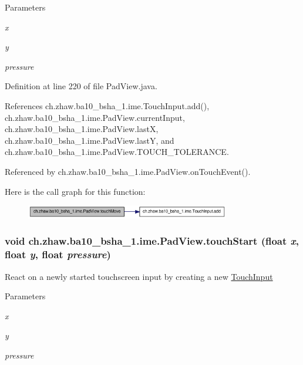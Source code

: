 \begin{DoxyParams}{Parameters}
\item[{\em x}]\item[{\em y}]\item[{\em pressure}]\end{DoxyParams}


Definition at line 220 of file PadView.java.

References ch.zhaw.ba10\_\-bsha\_\-1.ime.TouchInput.add(), ch.zhaw.ba10\_\-bsha\_\-1.ime.PadView.currentInput, ch.zhaw.ba10\_\-bsha\_\-1.ime.PadView.lastX, ch.zhaw.ba10\_\-bsha\_\-1.ime.PadView.lastY, and ch.zhaw.ba10\_\-bsha\_\-1.ime.PadView.TOUCH\_\-TOLERANCE.

Referenced by ch.zhaw.ba10\_\-bsha\_\-1.ime.PadView.onTouchEvent().

Here is the call graph for this function:\nopagebreak
\begin{figure}[H]
\begin{center}
\leavevmode
\includegraphics[width=253pt]{classch_1_1zhaw_1_1ba10__bsha__1_1_1ime_1_1PadView_a04937ec9e314a781c98cad2b080e63df_cgraph}
\end{center}
\end{figure}
\hypertarget{classch_1_1zhaw_1_1ba10__bsha__1_1_1ime_1_1PadView_aa6c73f1271801bab9f52b52e53ca9c06}{
\subsubsection[{touchStart}]{\setlength{\rightskip}{0pt plus 5cm}void ch.zhaw.ba10\_\-bsha\_\-1.ime.PadView.touchStart (float {\em x}, \/  float {\em y}, \/  float {\em pressure})}}
\label{classch_1_1zhaw_1_1ba10__bsha__1_1_1ime_1_1PadView_aa6c73f1271801bab9f52b52e53ca9c06}
React on a newly started touchscreen input by creating a new \hyperlink{classch_1_1zhaw_1_1ba10__bsha__1_1_1ime_1_1TouchInput}{TouchInput}


\begin{DoxyParams}{Parameters}
\item[{\em x}]\item[{\em y}]\item[{\em pressure}]\end{DoxyParams}


